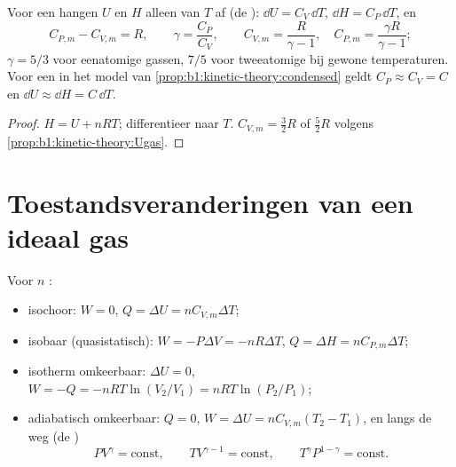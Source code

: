 \begin{proposition}\label{prop:b1:first-law:gas}
Voor een  hangen $U$ en $H$ alleen van $T$ af (de ):
$\dd U = C_V\,\dd T$, $\dd H = C_P\,\dd T$, en
\[
C_{P,m} - C_{V,m} = R, \qquad \gamma = \frac{C_P}{C_V}, \qquad
C_{V,m} = \frac{R}{\gamma - 1}, \quad C_{P,m} = \frac{\gamma R}{\gamma - 1} ;
\]
$\gamma = 5/3$ voor eenatomige gassen, $7/5$ voor tweeatomige bij gewone
temperaturen. Voor een  in het model van
\cref{prop:b1:kinetic-theory:condensed} geldt $C_P \approx C_V = C$ en
$\dd U \approx \dd H = C\,\dd T$.
\end{proposition}

\begin{proof}
$H = U + nRT$; differentieer naar $T$. $C_{V,m} = \tfrac32 R$ of
$\tfrac52 R$ volgens \cref{prop:b1:kinetic-theory:Ugas}.
\end{proof}

\section{Toestandsveranderingen van een ideaal gas}

\begin{proposition}\label{prop:b1:first-law:transformations}
Voor $n$  :
\begin{itemize}
  \item isochoor: $W = 0$, $Q = \Delta U = nC_{V,m}\Delta T$;
  \item isobaar (quasistatisch): $W = -P\Delta V = -nR\Delta T$, $Q = \Delta H =
        nC_{P,m}\Delta T$;
  \item isotherm omkeerbaar: $\Delta U = 0$, $W = -Q = -nRT\ln(V_2/V_1) =
        nRT\ln(P_2/P_1)$;
  \item adiabatisch omkeerbaar: $Q = 0$, $W = \Delta U = nC_{V,m}(T_2 - T_1)$,
        en langs de weg (de \emph{})
        \[
        PV^\gamma = \text{const}, \qquad TV^{\gamma - 1} = \text{const}, \qquad
        T^\gamma P^{1 - \gamma} = \text{const} .
        \]
\end{itemize}
\end{proposition}


